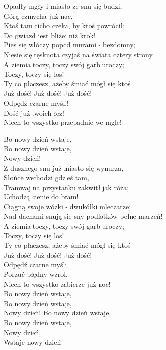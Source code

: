 
Opadły mgły i miasto ze snu się budzi, \\
Górą czmycha już noc, \tab{} \\
Ktoś tam cicho czeka, by ktoś powrócił; \\
Do gwiazd jest bliżej niż krok! \\
Pies się włóczy popod murami - bezdomny; \\
Niesie się tęsknota czyjaś na świata cztery strony \\
\hops
{} A ziemia toczy, toczy swój garb uroczy; \\
 Toczy, toczy się los! \\
 Ty co płaczesz, ażeby śmiać mógł się ktoś \\
 Już dość! Już dość! Już dość! \\
 Odpędź czarne myśli! \\
 Dość już twoich łez! \\
 Niech to wszystko przepadnie we mgle! 

 {} Bo nowy dzień wstaje, \\
 {} Bo nowy dzień wstaje, \\
 {} Nowy dzień! \\
\hops
Z dusznego snu już miasto się wynurza, \\
Słońce wschodzi gdzieś tam, \\
Tramwaj na przystanku zakwitł jak róża; \\
Uchodzą cienie do bram! \\
Ciągną swoje wózki - dwukółki mleczarze; \\
Nad dachami snują się sny podlotków pełne marzeń! \\
\hops
{} A ziemia toczy, toczy swój garb uroczy; \\
 Toczy, toczy się los! \\
 Ty co płaczesz, ażeby śmiać mógł się ktoś \\
 Już dość! Już dość! Już dość! \\
 Odpędź czarne myśli \\
 Porzuć błędny wzrok \\
 Niech to wszystko zabierze już noc! \\
 {} Bo nowy dzień wstaje, \tab{$\mid$} \\
 {} Bo nowy dzień wstaje, \tab{$\mid$}\\
 {} Nowy dzień! \tab{}
\hops
{} {} Bo nowy dzień wstaje, \\
 {} Bo nowy dzień wstaje, \\
 {} Nowy dzień, \\
 {} Wstaje nowy dzień
